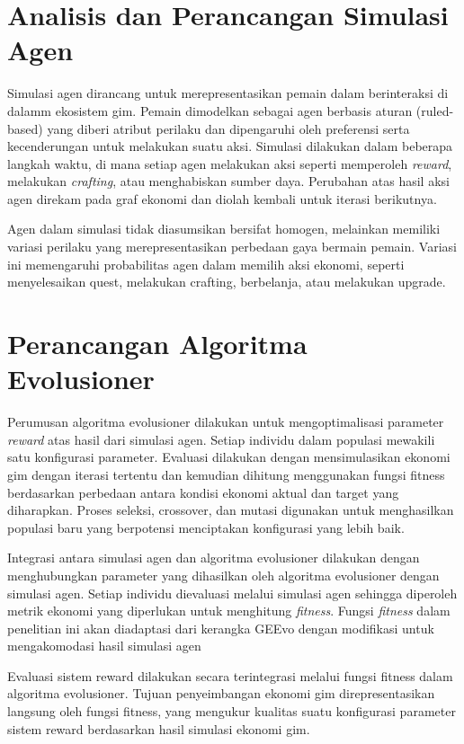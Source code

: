 \section{Analisis dan Perancangan Simulasi Agen}
Simulasi agen dirancang untuk merepresentasikan pemain dalam berinteraksi di dalamm ekosistem gim. Pemain dimodelkan sebagai agen berbasis aturan (ruled-based) yang diberi atribut perilaku dan dipengaruhi oleh preferensi serta kecenderungan untuk melakukan suatu aksi. Simulasi dilakukan dalam beberapa langkah waktu, di mana setiap agen melakukan aksi seperti memperoleh \textit{reward}, melakukan \textit{crafting}, atau menghabiskan sumber daya. Perubahan atas hasil aksi agen direkam pada graf ekonomi dan diolah kembali untuk iterasi berikutnya.

Agen dalam simulasi tidak diasumsikan bersifat homogen, 
melainkan memiliki variasi perilaku yang 
merepresentasikan perbedaan gaya bermain pemain. 
Variasi ini memengaruhi probabilitas agen dalam 
memilih aksi ekonomi, seperti menyelesaikan quest, 
melakukan crafting, berbelanja, atau melakukan upgrade.

\section{Perancangan Algoritma Evolusioner}
Perumusan algoritma evolusioner dilakukan untuk mengoptimalisasi parameter \textit{reward} atas hasil dari simulasi agen. Setiap individu dalam populasi mewakili satu konfigurasi parameter. Evaluasi dilakukan dengan mensimulasikan ekonomi gim dengan iterasi tertentu dan kemudian dihitung menggunakan fungsi fitness berdasarkan perbedaan antara kondisi ekonomi aktual dan target yang diharapkan. Proses seleksi, crossover, dan mutasi digunakan untuk menghasilkan populasi baru yang berpotensi menciptakan konfigurasi yang lebih baik. 

Integrasi antara simulasi agen dan algoritma evolusioner dilakukan dengan menghubungkan parameter yang dihasilkan oleh algoritma evolusioner dengan simulasi agen. Setiap individu dievaluasi melalui simulasi agen sehingga diperoleh metrik ekonomi yang diperlukan untuk menghitung \textit{fitness}. Fungsi \textit{fitness} dalam penelitian ini akan diadaptasi dari kerangka GEEvo 
dengan modifikasi untuk mengakomodasi hasil simulasi agen

Evaluasi sistem reward dilakukan secara terintegrasi
melalui fungsi fitness dalam algoritma evolusioner. Tujuan penyeimbangan
ekonomi gim direpresentasikan langsung oleh fungsi fitness, yang
mengukur kualitas suatu konfigurasi parameter sistem reward berdasarkan
hasil simulasi ekonomi gim.

